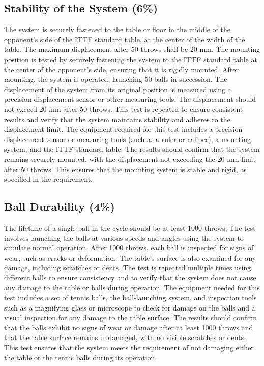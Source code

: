 \documentclass[12pt]{report}
\begin{document}
\subsection{Stability of the System (6\%)}
The system is securely fastened to the table or floor in the middle of the opponent’s side of the ITTF standard table, at the center of the width of the table. The maximum displacement after 50 throws shall be 20 mm. The mounting position is tested by securely fastening the system to the ITTF standard table at the center of the opponent's side, ensuring that it is rigidly mounted. After mounting, the system is operated, launching 50 balls in succession. The displacement of the system from its original position is measured using a precision displacement sensor or other measuring tools. The displacement should not exceed 20 mm after 50 throws. This test is repeated to ensure consistent results and verify that the system maintains stability and adheres to the displacement limit. The equipment required for this test includes a precision displacement sensor or measuring tools (such as a ruler or caliper), a mounting system, and the ITTF standard table. The results should confirm that the system remains securely mounted, with the displacement not exceeding the 20 mm limit after 50 throws. This ensures that the mounting system is stable and rigid, as specified in the requirement.
\subsection{Ball Durability (4\%)}
The lifetime of a single ball in the cycle should be at least 1000 throws. The test involves launching the balls at various speeds and angles using the system to simulate normal operation. After 1000 throws, each ball is inspected for signs of wear, such as cracks or deformation. The table's surface is also examined for any damage, including scratches or dents. The test is repeated multiple times using different balls to ensure consistency and to verify that the system does not cause any damage to the table or balls during operation. The equipment needed for this test includes a set of tennis balls, the ball-launching system, and inspection tools such as a magnifying glass or microscope to check for damage on the balls and a visual inspection for any damage to the table surface. The results should confirm that the balls exhibit no signs of wear or damage after at least 1000 throws and that the table surface remains undamaged, with no visible scratches or dents. This test ensures that the system meets the requirement of not damaging either the table or the tennis balls during its operation.
\end{document}
